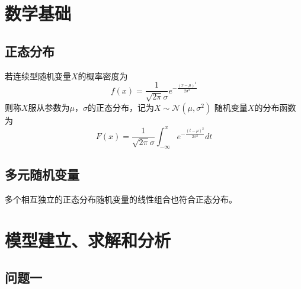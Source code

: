\documentclass[UTF8]{ctexart}
\begin{document}
	\section{数学基础}
	\subsection{正态分布}
	若连续型随机变量$X$的概率密度为
	\begin{equation}
		f(x)=\frac{1}{\sqrt{2\pi}\sigma}e^{-\frac{(x-\mu)^2}{2\sigma^2}}
	\end{equation}
	则称$X$服从参数为$\mu$，$\sigma$的正态分布，记为$X\sim\mathcal{N}(\mu,\sigma^2)$
	随机变量$X$的分布函数为
	\begin{equation}
		F(x)=\frac{1}{\sqrt{2\pi}\sigma}\int^{x}_{-\infty}e^{-\frac{(t-\mu)^2}{2\sigma^2}}dt
	\end{equation}
	\subsection{多元随机变量}
	多个相互独立的正态分布随机变量的线性组合也符合正态分布。
	
	\section{模型建立、求解和分析}
	\subsection{问题一}
\end{document}
